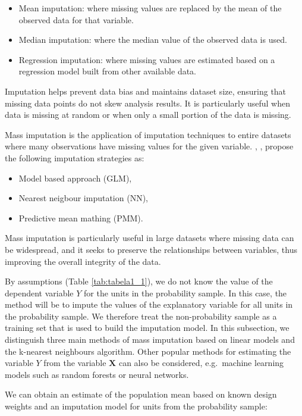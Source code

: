\documentclass[
]{jss}
\begin{document}
\begin{itemize}
    \item Mean imputation: where missing values are replaced by the mean of the observed data for that variable.
    \item Median imputation: where the median value of the observed data is used.
    \item Regression imputation: where missing values are estimated based on a regression model built from other available data.
\end{itemize}

Imputation helps prevent data bias and maintains dataset size, ensuring
that missing data points do not skew analysis results. It is
particularly useful when data is missing at random or when only a small
portion of the data is missing.

Mass imputation is the application of imputation techniques to entire
datasets where many observations have missing values for the given
variable. \citet{kim_combining_2021}, \citet{yang2021integration},
\citet{Beres} propose the following imputation strategies as:

\begin{itemize}
    \item Model based approach (GLM),
    \item Nearest neigbour imputation (NN),
    \item Predictive mean mathing (PMM).
\end{itemize}

Mass imputation is particularly useful in large datasets where missing
data can be widespread, and it seeks to preserve the relationships
between variables, thus improving the overall integrity of the data.

By assumptions (Table \ref{tab:tabela1_1}), we do not know the value of
the dependent variable \(Y\) for the units in the probability sample. In
this case, the method will be to impute the values of the explanatory
variable for all units in the probability sample. We therefore treat the
non-probability sample as a training set that is used to build the
imputation model. In this subsection, we distinguish three main methods
of mass imputation based on linear models and the k-nearest neighbours
algorithm. Other popular methods for estimating the variable \(Y\) from
the variable \(\boldsymbol{X}\) can also be considered, e.g.~machine
learning models such as random forests or neural networks.

We can obtain an estimate of the population mean based on known design
weights and an imputation model for units from the probability sample:
\end{document}
